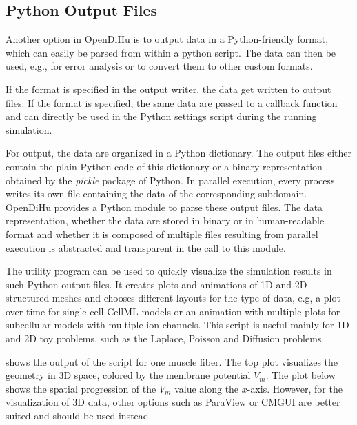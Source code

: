 \subsection{Python Output Files}
Another option in OpenDiHu is to output data in a Python-friendly format, which can easily be parsed from within a python script.
The data can then be used, e.g., for error analysis or to convert them to other custom formats.

If the format  is specified in the output writer, the data get written to output files. If the format  is specified, the same data are passed to a callback function and can directly be used in the Python settings script during the running simulation. 

For output, the data are organized in a Python dictionary. The output files either contain the plain Python code of this dictionary or a binary representation obtained by the \emph{pickle} package of Python. In parallel execution, every process writes its own file containing the data of the corresponding subdomain. OpenDiHu provides a Python module to parse these output files. The data representation, whether the data are stored in binary or in human-readable format and whether it is composed of multiple files resulting from parallel execution is abstracted and transparent in the call to this module.

The utility program  can be used to quickly visualize the simulation results in such Python output files. It creates plots and animations of 1D and 2D structured meshes and chooses different layouts for the type of data, e.g, a plot over time for single-cell CellML models or an animation with multiple plots for subcellular models with multiple ion channels. This script is useful mainly for 1D and 2D toy problems, such as the Laplace, Poisson and Diffusion problems.

 shows the output of the  script for one muscle fiber. The top plot visualizes the geometry in 3D space, colored by the membrane potential $V_m$. The plot below shows the spatial progression of the $V_m$ value along the $x$-axis. However, for the visualization of 3D data, other options such as ParaView or CMGUI are better suited and should be used instead.

